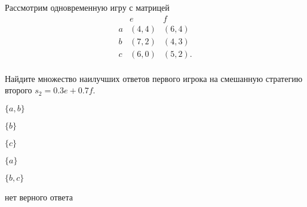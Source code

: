 
\begin{question}
Рассмотрим одновременную игру с матрицей \[
\begin{matrix}
   & e & f \\
a  & (4, 4) & (6, 4) \\
b  & (7, 2) & (4, 3) \\ 
c  & (6, 0) & (5, 2). \\ 
\end{matrix}
\]

Найдите множество наилучших ответов первого игрока на смешанную
стратегию второго \(s_2 = 0.3e + 0.7f\).
\begin{answerlist}
  \item \(\{a, b\}\)
  \item \(\{b\}\)
  \item \(\{c\}\)
  \item \(\{a\}\)
  \item \(\{b, c\}\)
  \item нет верного ответа
\end{answerlist}
\end{question}


